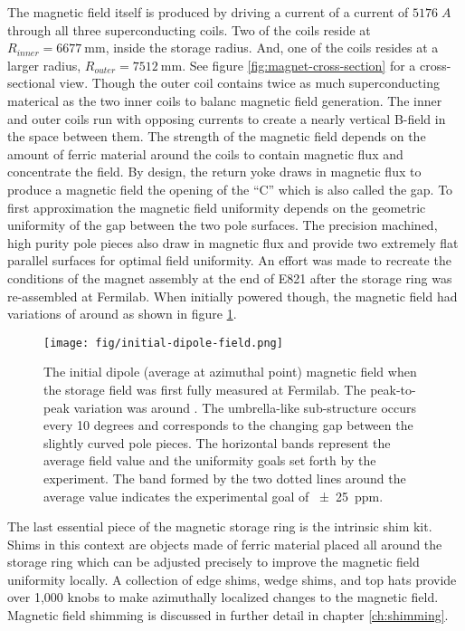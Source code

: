 The magnetic field itself is produced by driving a current of a current of $5176\;A$ through all three superconducting coils.  Two of the coils reside at $R_{inner} = \SI{6677}{\mm}$, inside the storage radius. And, one of the coils resides at a larger radius, $R_{outer} = \SI{7512}{\mm}$. See figure \ref{fig:magnet-cross-section} for a cross-sectional view.  Though the outer coil contains twice as much superconducting materical as the two inner coils to balanc magnetic field generation.  The inner and outer coils run with opposing currents to create a nearly vertical B-field in the space between them.  The strength of the magnetic field depends on the amount of ferric material around the coils to contain magnetic flux and concentrate the field.  By design, the return yoke draws in magnetic flux to produce a \bmagic magnetic field the opening of the ``C'' which is also called the gap.  To first approximation the magnetic field uniformity depends on the geometric uniformity of the gap between the two pole surfaces.  The precision machined, high purity pole pieces also draw in magnetic flux and provide two extremely flat parallel surfaces for optimal field uniformity.  An effort was made to recreate the conditions of the magnet assembly at the end of E821 after the storage ring was re-assembled at Fermilab.  When initially powered though, the magnetic field had variations of around  as shown in figure \ref{fig:initial-field}.

\begin{figure}
\label{fig:initial-field}
\centering
\texttt{[image: fig/initial-dipole-field.png]}
\caption{The initial dipole (average at azimuthal point) magnetic field when the storage field was first fully measured at Fermilab.  The peak-to-peak variation was around .  The umbrella-like sub-structure occurs every 10 degrees and corresponds to the changing gap between the slightly curved pole pieces.  The horizontal bands represent the average field value and the uniformity goals set forth by the experiment.  The band formed by the two dotted lines around the average value indicates the experimental goal of \SI{\pm 25}{ppm}.}
\end{figure}

The last essential piece of the magnetic storage ring is the intrinsic shim kit.  Shims in this context are objects made of ferric material placed all around the storage ring which can be adjusted precisely to improve the magnetic field uniformity locally. A collection of edge shims, wedge shims, and top hats provide over 1,000 knobs to make azimuthally localized changes to the magnetic field.
Magnetic field shimming is discussed in further detail in chapter \ref{ch:shimming}.

